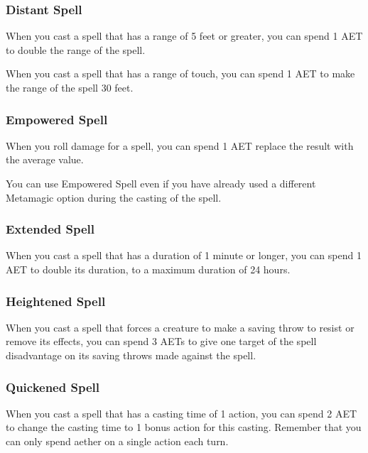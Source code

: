 \subsubsection{Distant Spell}

When you cast a spell that has a range of 5 feet or greater, you can spend 1 AET to double the range of the spell.

When you cast a spell that has a range of touch, you can spend 1 AET to make the range of the spell 30 feet.

\subsubsection{Empowered Spell}

When you roll damage for a spell, you can spend 1 AET replace the result with the average value.

You can use Empowered Spell even if you have already used a different Metamagic option during the casting of the spell.

\subsubsection{Extended Spell}

When you cast a spell that has a duration of 1 minute or longer, you can spend 1 AET to double its duration, to a maximum duration of 24 hours.

\subsubsection{Heightened Spell}

When you cast a spell that forces a creature to make a saving throw to resist or remove its effects, you can spend 3 AETs to give one target of the spell disadvantage on its saving throws made against the spell.

\subsubsection{Quickened Spell}

When you cast a spell that has a casting time of 1 action, you can spend 2 AET to change the casting time to 1 bonus action for this casting. Remember that you can only spend aether on a single action each turn.

